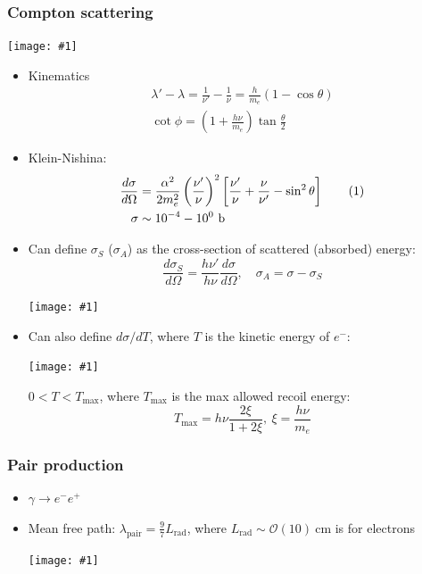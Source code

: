 \documentclass[11pt]{article}
\newcommand\numberthis{\addtocounter{equation}{1}\tag{\theequation}}
\newcommand{\dd}[2]{\dfrac{d #1}{d #2}}
\newcommand{\cm}{\text{cm}}
\newcommand{\ba}{\text{b}}
\newcommand{\el}{\ensuremath{e^{-}}\xspace}
\newcommand{\pos}{\ensuremath{e^{+}}\xspace}
\newcommand{\ord}[1]{\ensuremath{\mathcal{O}(#1)}}
\newcommand{\embedimgw}[2]{\begin{center}\texttt{[image: \#1]}\end{center}}
\begin{document}
\subsubsection{Compton scattering}
\embedimgw{figs/compton_feynman.png}{0.4}
\begin{itemize}
  \item Kinematics
    \begin{gather*}
      \lambda'-\lambda = \frac{1}{\nu'} - \frac{1}{\nu} = \frac{h}{m_e} \left(1-\cos\theta\right)\\
      \cot\phi = \left(1+\frac{h\nu}{m_e}\right)\tan \frac{\theta}{2}
    \end{gather*}
  \item Klein-Nishina:
    \begin{align*}
      \dd\sigma\Omega &= \frac{\alpha^2}{2m_e^2} \left(\frac{\nu'}{\nu}\right)^2 \left[\frac{\nu'}{\nu}+\frac{\nu}{\nu'} - \sin^2\theta\right] \numberthis \\
       \sigma & \sim 10^{-4} - 10^0~\ba
    \end{align*}
  \item Can define $\sigma_S$ ($\sigma_A$) as the cross-section of scattered (absorbed) energy:
    \begin{equation}
      \dd{\sigma_S}{\Omega} = \frac{h\nu'}{h\nu}\dd\sigma\Omega, \quad \sigma_A = \sigma-\sigma_S
    \end{equation}
    \embedimgw{figs/sigma_compton.png}{.8}
  \item Can also define $d\sigma/dT$, where $T$ is the kinetic energy of $\el$:

  \begin{minipage}{.4\textwidth}
    \embedimgw{figs/dEdT_compton.png}{.8}
  \end{minipage}
  \begin{minipage}{.6\textwidth}
      $0 < T < T_\text{max}$, where $T_{\max}$ is the max allowed recoil energy:
      \begin{equation}
        T_{\max} = h\nu \frac{2\xi}{1+2\xi},~\xi = \frac{h\nu}{m_e}
      \end{equation}
  \end{minipage}
\end{itemize}

\subsubsection{Pair production}
\begin{itemize}
  \item $\gamma\rightarrow \el\pos$
  \item Mean free path: $\lambda_\text{pair} = \frac{9}{7}L_\text{rad}$, where $L_\text{rad}\sim \ord{10}~\cm$ is for electrons
  \embedimgw{figs/sigma_pair.png}{.4}
\end{itemize}
\end{document}
